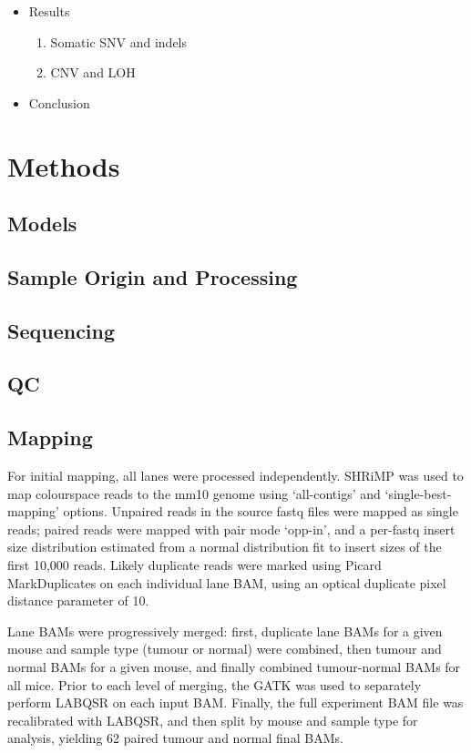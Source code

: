 \documentclass[dissertation.tex]{subfiles}
\begin{document}
\begin{itemize}
  \item Results
  \begin{enumerate}
    \item Somatic SNV and indels
    \item CNV and LOH
  \end{enumerate}

  \item Conclusion
  
\end{itemize}

\section{Methods}

\subsection{Models}

\subsection{Sample Origin and Processing}

\subsection{Sequencing}

\subsection{QC}

\subsection{Mapping}

For initial mapping, all lanes were processed independently.  SHRiMP was used to map colourspace reads to the mm10 genome using `all-contigs' and `single-best-mapping' options.  Unpaired reads in the source fastq files were mapped as single reads; paired reads were mapped with pair mode `opp-in', and a per-fastq insert size distribution estimated from a normal distribution fit to insert sizes of the first 10,000 reads.  Likely duplicate reads were marked using Picard MarkDuplicates on each individual lane \gls{BAM}, using an optical duplicate pixel distance parameter of 10.

Lane \glspl{BAM} were progressively merged: first, duplicate lane \glspl{BAM} for a given mouse and sample type (tumour or normal) were combined, then tumour and normal \glspl{BAM} for a given mouse, and finally combined tumour-normal \glspl{BAM} for all mice.  Prior to each level of merging, the \gls{GATK} was used to separately perform \gls{LABQSR} on each input \gls{BAM}.  Finally, the full experiment \gls{BAM} file was recalibrated with \gls{LABQSR}, and then split by mouse and sample type for analysis, yielding 62 paired tumour and normal final \glspl{BAM}.
\end{document}
